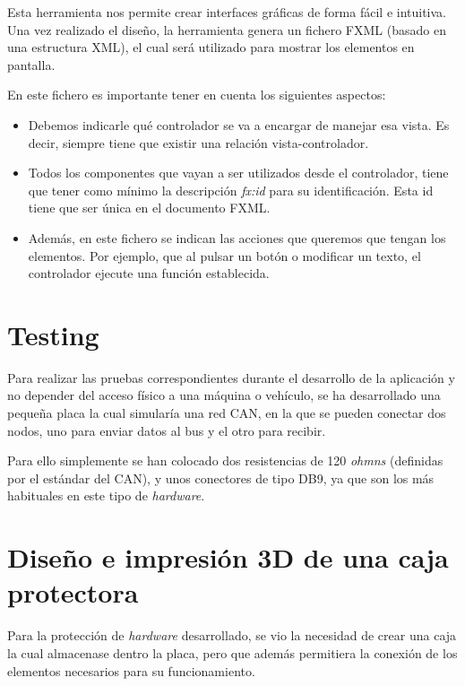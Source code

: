 Esta herramienta nos permite crear interfaces gráficas de forma fácil e intuitiva. Una vez realizado el diseño, la herramienta genera un fichero FXML (basado en una estructura XML), el cual será utilizado para mostrar los elementos en pantalla.

En este fichero es importante tener en cuenta los siguientes aspectos:

\begin{itemize}

\item
Debemos indicarle qué controlador se va a encargar de manejar esa vista. Es decir, siempre tiene que existir una relación vista-controlador.
\item
Todos los componentes que vayan a ser utilizados desde el controlador, tiene que tener como mínimo la descripción \emph{fx:id} para su identificación. Esta id tiene que ser única en el documento FXML.
\item
Además, en este fichero se indican las acciones que queremos que tengan los elementos. Por ejemplo, que al pulsar un botón o modificar un texto, el controlador ejecute una función establecida.

\end{itemize}


\section{Testing}\label{testing}

Para realizar las pruebas correspondientes durante el desarrollo de la aplicación y no depender del acceso físico a una máquina o vehículo, se ha desarrollado una pequeña placa la cual simularía una red CAN, en la que se pueden conectar dos nodos, uno para enviar datos al bus y el otro para recibir.

Para ello simplemente se han colocado dos resistencias de 120 \emph{ohmns} (definidas por el estándar del CAN), y unos conectores de tipo DB9, ya que son los más habituales en este tipo de \emph{hardware}.


\section{Diseño e impresión 3D de una caja protectora}\label{desarrollo_e_impresion_3d_de_una_caja_protectora}

Para la protección de \emph{hardware} desarrollado, se vio la necesidad de crear una caja la cual almacenase dentro la placa, pero que además permitiera la conexión de los elementos necesarios para su funcionamiento.

